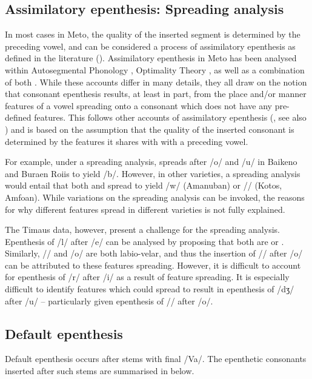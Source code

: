 \documentclass[output=paper]{langscibook}
\begin{document}
\subsection{Assimilatory epenthesis: Spreading analysis}\label{sec:SpreadAcc}
In most cases in Meto, the quality 
of the inserted segment is determined by the preceding vowel, and can be considered a process  
of assimilatory epenthesis as defined in the literature (). 
Assimilatory epenthesis in Meto has
been analysed within Autosegmental Phonology
\citep[215--233]{ed20}, Optimality Theory \citep{mo21},
as well as a combination of both \citep[48--57]{cu18}.
While these accounts differ in many details,
they all draw on the notion that consonant epenthesis results,
at least in part, from the
place and/or manner
features of a vowel spreading onto a 
consonant which does not have any pre-defined features.
This follows other accounts of assimilatory
epenthesis (\citealp{dl06,st14}, see also )
and is based on the assumption that the quality of the
inserted consonant is determined by the features it shares with with a preceding vowel. 
 
For example, under a spreading 
analysis, \tsc{[+labial]} spreads after /o/ and /u/
in Baikeno and Buraen Roi{\Q}is to yield /b/.
However, in other varieties, a spreading analysis would entail that both 
\tsc{[+labial]} and \tsc{[+velar]}
spread to yield /w/ (Amanuban) or /\gw/ (Kotos, Amfo{\Q}an).
While variations on the spreading analysis can be invoked,
the reasons for why different features spread in different varieties is not fully explained.

The Timaus data, however, present a challenge for the spreading analysis.
Epenthesis of /l/ after /e/ can be analysed by proposing
that both are  \citep[51]{cu18} or 
 \citep{mo21}.
Similarly, /\gw/ and /o/ are both labio-velar, and 
thus the insertion of /\gw/ after /o/ can be attributed to these features spreading. 
However, it is difficult to account for epenthesis of 
\mbox{/r/} after \mbox{/i/} as a result of feature spreading.
It is especially difficult to identify
features which could spread to result in epenthesis of \mbox{/dʒ/} after \mbox{/u/} 
 -- particularly given epenthesis of \mbox{/\gw/} after \mbox{/o/}. 

\subsection{Default epenthesis}\label{sec:Def}
Default epenthesis  occurs after stems with final /Va/.
The epenthetic consonants inserted after such stems are
summarised in  below.
\end{document}

